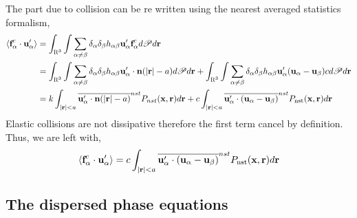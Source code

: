 The part due to collision can be re written using the nearest averaged statistics formalism, 
\begin{align*}
    \left<\textbf{f}_\alpha^c\cdot \textbf{u}_\alpha'\right>
    &= \int_{\textsc{R}^3}
    \int \sum_{\alpha \neq \beta} \delta_\alpha \delta_\beta h_{\alpha\beta}
    \textbf{u}'_\alpha \textbf{f}_\alpha^c d\mathscr{P} d\textbf{r}\\
    &= \int_{\textsc{R}^3}
    \int \sum_{\alpha \neq \beta} \delta_\alpha \delta_\beta h_{\alpha\beta}
    \textbf{u}'_\alpha \cdot \textbf{n}
        (|\textbf{r}| - a) 
     d\mathscr{P} d\textbf{r}
    + \int_{\textsc{R}^3}
    \int \sum_{\alpha \neq \beta} \delta_\alpha \delta_\beta h_{\alpha\beta}
    \textbf{u}'_\alpha 
         (\textbf{u}_\alpha - \textbf{u}_\beta) c
     d\mathscr{P} d\textbf{r}\\
    &=k \int_{|\textbf{r}|<a}
    \overline{\textbf{u}'_\alpha \cdot \textbf{n}
        (|\textbf{r}| - a)   }^{nst}
        P_{nst}(\textbf{x},\textbf{r})
     d\textbf{r}
    +c \int_{|\textbf{r}|<a}
        \overline{\textbf{u}'_\alpha 
         \cdot (\textbf{u}_\alpha - \textbf{u}_\beta)}^{nst} P_\text{nst}(\textbf{x},\textbf{r})
     d\textbf{r}\\
\end{align*}
Elastic collisions are not dissipative therefore the first term cancel by definition. 
Thus, we are left with, 
\begin{align*}
    \left<\textbf{f}_\alpha^c\cdot \textbf{u}_\alpha'\right>
    = c \int_{|\textbf{r}|<a}
        \overline{\textbf{u}'_\alpha 
         \cdot (\textbf{u}_\alpha - \textbf{u}_\beta)}^{nst} P_\text{nst}(\textbf{x},\textbf{r})
     d\textbf{r} 
\end{align*}
\subsection{The dispersed phase equations}

